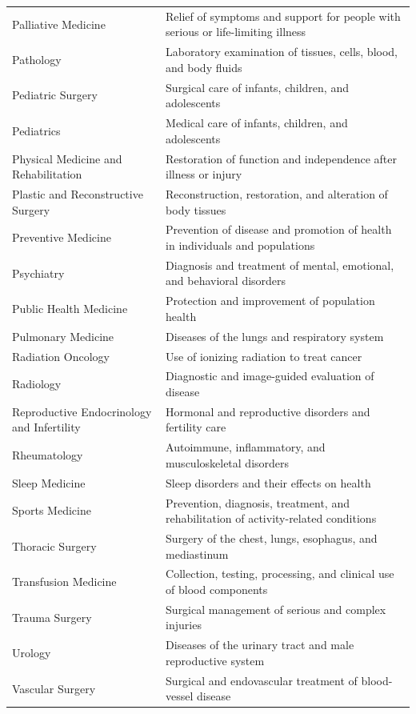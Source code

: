 \begin{longtable}{>{\raggedright\arraybackslash}p{} >{\raggedright\arraybackslash}p{}}
Palliative Medicine & Relief of symptoms and support for people with serious or life-limiting illness \\
Pathology & Laboratory examination of tissues, cells, blood, and body fluids \\
Pediatric Surgery & Surgical care of infants, children, and adolescents \\
Pediatrics & Medical care of infants, children, and adolescents \\
Physical Medicine and Rehabilitation & Restoration of function and independence after illness or injury \\
Plastic and Reconstructive Surgery & Reconstruction, restoration, and alteration of body tissues \\
Preventive Medicine & Prevention of disease and promotion of health in individuals and populations \\
Psychiatry & Diagnosis and treatment of mental, emotional, and behavioral disorders \\
Public Health Medicine & Protection and improvement of population health \\
Pulmonary Medicine & Diseases of the lungs and respiratory system \\
Radiation Oncology & Use of ionizing radiation to treat cancer \\
Radiology & Diagnostic and image-guided evaluation of disease \\
Reproductive Endocrinology and Infertility & Hormonal and reproductive disorders and fertility care \\
Rheumatology & Autoimmune, inflammatory, and musculoskeletal disorders \\
Sleep Medicine & Sleep disorders and their effects on health \\
Sports Medicine & Prevention, diagnosis, treatment, and rehabilitation of activity-related conditions \\
Thoracic Surgery & Surgery of the chest, lungs, esophagus, and mediastinum \\
Transfusion Medicine & Collection, testing, processing, and clinical use of blood components \\
Trauma Surgery & Surgical management of serious and complex injuries \\
Urology & Diseases of the urinary tract and male reproductive system \\
Vascular Surgery & Surgical and endovascular treatment of blood-vessel disease \\
\end{longtable}
